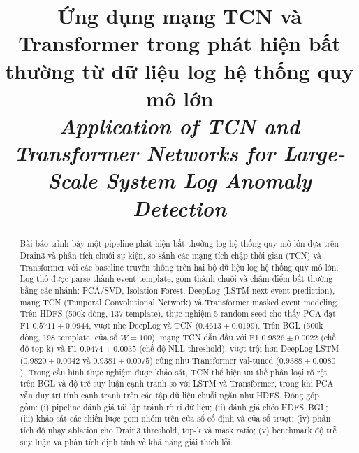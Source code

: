 \documentclass[conference]{IEEEtran}
\begin{document}
\title{
\textbf{Ứng dụng mạng TCN và Transformer trong phát hiện bất thường từ dữ liệu log hệ thống quy mô lớn}\\[0.8em]
\large\textit{Application of TCN and Transformer Networks for Large-Scale System Log Anomaly Detection}
}

\author{
\and
{}
}

\maketitle

\begin{abstract}
Bài báo trình bày một pipeline phát hiện bất thường log hệ thống quy mô lớn dựa trên Drain3 và phân tích chuỗi sự kiện, so sánh các mạng tích chập thời gian (TCN) và Transformer với các baseline truyền thống trên hai bộ dữ liệu log hệ thống quy mô lớn. Log thô được parse thành event template, gom thành chuỗi và chấm điểm bất thường bằng các nhánh: PCA/SVD, Isolation Forest, DeepLog (LSTM next-event prediction), mạng TCN (Temporal Convolutional Network) và Transformer masked event modeling. Trên HDFS (500k dòng, 137 template), thực nghiệm 5 random seed cho thấy PCA đạt F1 $0.5711 \pm 0.0944$, vượt nhẹ DeepLog và TCN ($0.4613 \pm 0.0199$). Trên BGL (500k dòng, 198 template, cửa sổ $W{=}100$), mạng TCN dẫn đầu với F1 $0.9826 \pm 0.0022$ (chế độ top-k) và F1 $0.9474 \pm 0.0035$ (chế độ NLL threshold), vượt trội hơn DeepLog LSTM ($0.9820 \pm 0.0042$ và $0.9381 \pm 0.0075$) cũng như Transformer val-tuned ($0.9388 \pm 0.0080$). Trong cấu hình thực nghiệm được khảo sát, TCN thể hiện ưu thế phân loại rõ rệt trên BGL và độ trễ suy luận cạnh tranh so với LSTM và Transformer, trong khi PCA vẫn duy trì tính cạnh tranh trên các tập dữ liệu chuỗi ngắn như HDFS. Đóng góp gồm: (i) pipeline đánh giá tái lập tránh rò rỉ dữ liệu; (ii) đánh giá chéo HDFS--BGL; (iii) khảo sát các chiến lược gom nhóm trên cửa sổ cố định và cửa sổ trượt; (iv) phân tích độ nhạy ablation cho Drain3 threshold, top-k và mask ratio; (v) benchmark độ trễ suy luận và phân tích định tính về khả năng giải thích lỗi.
\end{abstract}
\end{document}
